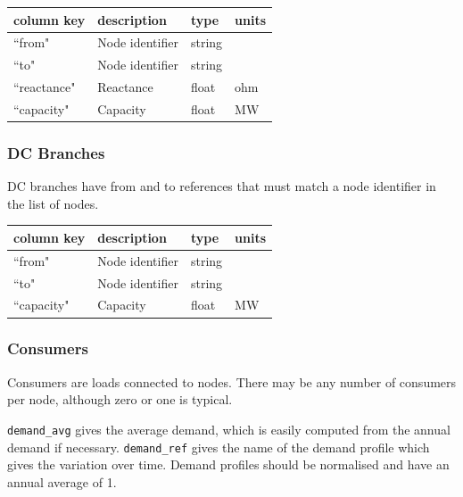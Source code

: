 \documentclass{article}
\begin{document}
\medskip
\begin{tabular}{llll}
	\hline
	column key & description & type & units \\
	\hline
	``from"	&	Node identifier 	& string	& \\
	``to"		&	Node identifier	& string	& \\
	``reactance"	&	Reactance	& float	& ohm \\
	``capacity"		&	Capacity & float		& MW \\
	\hline
\end{tabular}

\subsubsection{DC Branches}
DC branches have from and to references that must match a node identifier in the list of nodes.

\medskip
\begin{tabular}{llll}
	\hline
	column key & description & type & units \\
	\hline
	``from"	&	Node identifier 	& string	& \\
	``to"		&	Node identifier	& string	& \\
	``capacity"		&	Capacity & float		& MW \\
	\hline
\end{tabular}


\subsubsection{Consumers}
Consumers are loads connected to nodes. There may be any number of consumers per node, although zero or one is typical.

\texttt{demand\_avg} gives the average demand, which is easily computed from the annual demand if necessary.
\texttt{demand\_ref} gives the name of the demand profile which gives the variation over time. Demand profiles should be normalised and have an annual average of 1.
\end{document}
